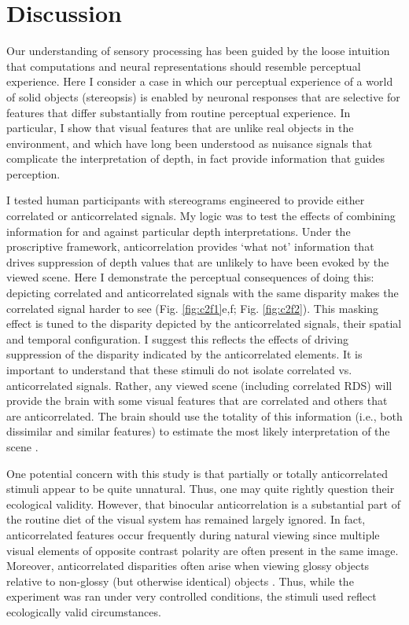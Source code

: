 \section{Discussion}
Our understanding of sensory processing has been guided by the loose intuition that computations and neural representations should resemble perceptual experience. Here I consider a case in which our perceptual experience of a world of solid objects (stereopsis) is enabled by neuronal responses that are selective for features that differ substantially from routine perceptual experience. In particular, I show that visual features that are unlike real objects in the environment, and which have long been understood as nuisance signals that complicate the interpretation of depth, in fact provide information that guides perception.

I tested human participants with stereograms engineered to provide either correlated or anticorrelated signals. My logic was to test the effects of combining information for and against particular depth interpretations. Under the proscriptive framework, anticorrelation provides `what not' information that drives suppression of depth values that are unlikely to have been evoked by the viewed scene. Here I demonstrate the perceptual consequences of doing this: depicting correlated and anticorrelated signals with the same disparity makes the correlated signal harder to see (Fig. \ref{fig:c2f1}e,f; Fig. \ref{fig:c2f2}). This masking effect is tuned to the disparity depicted by the anticorrelated signals, their spatial and temporal configuration. I suggest this reflects the effects of driving suppression of the disparity indicated by the anticorrelated elements. It is important to understand that these stimuli do not isolate correlated vs. anticorrelated signals. Rather, any viewed scene (including correlated RDS) will provide the brain with some visual features that are correlated and others that are anticorrelated. The brain should use the totality of this information (i.e., both dissimilar and similar features) to estimate the most likely interpretation of the scene \cite{Goncalves:2017aa}.

One potential concern with this study is that partially or totally anticorrelated stimuli appear to be quite unnatural. Thus, one may quite rightly question their ecological validity. However, that binocular anticorrelation is a substantial part of the routine diet of the visual system has remained largely ignored. In fact, anticorrelated features occur frequently during natural viewing since multiple visual elements of opposite contrast polarity are often present in the same image. Moreover, anticorrelated disparities often arise when viewing glossy objects relative to non-glossy (but otherwise identical) objects \cite{Muryy:2014hk,Muryy:2016km}. Thus, while the experiment was ran under very controlled conditions, the stimuli used reflect ecologically valid circumstances.

